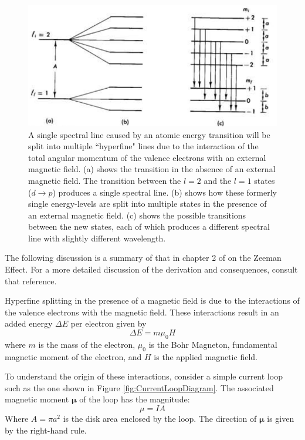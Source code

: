 \documentclass[twocolumn]{article}
\begin{document}
		\begin{figure}
			\centering
			\includegraphics[width=1.0\linewidth]{Images/SpectralSplitting}
			\caption{A single spectral line caused by an atomic energy transition will be split into multiple ``hyperfine" lines due to the interaction of the total angular momentum of the valence electrons with an external magnetic field. (a) shows the transition in the absence of an external magnetic field. The transition between the $l=2$ and the $l=1$ states ($d\rightarrow p$) produces a single spectral line. (b) shows how these formerly single energy-levels are split into multiple states in the presence of an external magnetic field. (c) shows the possible transitions between the new states, each of which produces a different spectral line with slightly different wavelength.}
			\label{fig:SpectralSplitting}
		\end{figure}
		
		The following discussion is a summary of that in chapter 2 of \cite{melissinos_experiments_1966} on the Zeeman Effect.
		For a more detailed discussion of the derivation and consequences, consult that reference.
		
		Hyperfine splitting in the presence of a magnetic field is due to the interactions of the valence electrons with the magnetic field.
		These interactions result in an added energy $\Delta E$ per electron given by
		\begin{equation}
			\Delta E = m\mu_0H
		\end{equation}
		where $m$ is the mass of the electron, $\mu_0$ is the Bohr Magneton, fundamental magnetic moment of the electron, and $H$ is the applied magnetic field.
		
		To understand the origin of these interactions, consider a simple current loop such as the one shown in Figure \ref{fig:CurrentLoopDiagram}.
		The associated magnetic moment $\mathbf{\mu}$ of the loop has the magnitude:
		\begin{equation}
			\mu = IA
		\end{equation}
		Where $A=\pi a^2$ is the disk area enclosed by the loop.
		The direction of $\mathbf{\mu}$ is given by the right-hand rule.
		
\end{document}
